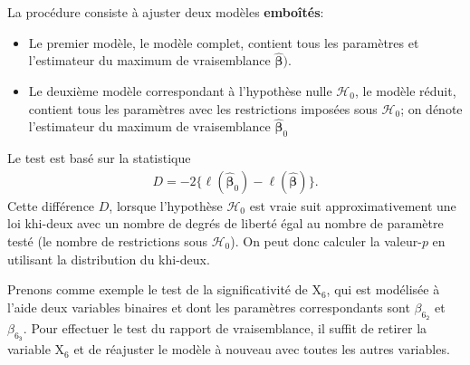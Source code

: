 \documentclass[
  11pt,
  letterpaper,
]{scrbook}
\newenvironment{Shaded}{\begin{snugshade}}{\end{snugshade}}
\newcommand{\AttributeTok}[1]{\textcolor[rgb]{0.40,0.45,0.13}{#1}}
\newcommand{\CommentTok}[1]{\textcolor[rgb]{0.37,0.37,0.37}{#1}}
\newcommand{\ConstantTok}[1]{\textcolor[rgb]{0.56,0.35,0.01}{#1}}
\newcommand{\DecValTok}[1]{\textcolor[rgb]{0.68,0.00,0.00}{#1}}
\newcommand{\DocumentationTok}[1]{\textcolor[rgb]{0.37,0.37,0.37}{\textit{#1}}}
\newcommand{\FunctionTok}[1]{\textcolor[rgb]{0.28,0.35,0.67}{#1}}
\newcommand{\NormalTok}[1]{\textcolor[rgb]{0.00,0.23,0.31}{#1}}
\newcommand{\OtherTok}[1]{\textcolor[rgb]{0.00,0.23,0.31}{#1}}
\newcommand{\SpecialCharTok}[1]{\textcolor[rgb]{0.37,0.37,0.37}{#1}}
\newcommand{\StringTok}[1]{\textcolor[rgb]{0.13,0.47,0.30}{#1}}
\providecommand{\tightlist}{%
  \setlength{\itemsep}{0pt}\setlength{\parskip}{0pt}}\usepackage{longtable,booktabs,array}
\theoremstyle{definition}
\theoremstyle{remark}
\begin{document}
La procédure consiste à ajuster deux modèles \textbf{emboîtés}:

\begin{itemize}
\tightlist
\item
  Le premier modèle, le modèle complet, contient tous les paramètres et
  l'estimateur du maximum de vraisemblance
  \(\widehat{\boldsymbol{\beta}})\).
\item
  Le deuxième modèle correspondant à l'hypothèse nulle
  \(\mathscr{H}_0\), le modèle réduit, contient tous les paramètres avec
  les restrictions imposées sous \(\mathscr{H}_0\); on dénote
  l'estimateur du maximum de vraisemblance
  \(\widehat{\boldsymbol{\beta}}_0\)
\end{itemize}

Le test est basé sur la statistique \begin{align*}
 D = -2\{\ell(\widehat{\boldsymbol{\beta}}_0)-\ell(\widehat{\boldsymbol{\beta}})\}.
\end{align*} Cette différence \(D\), lorsque l'hypothèse
\(\mathscr{H}_0\) est vraie suit approximativement une loi khi-deux avec
un nombre de degrés de liberté égal au nombre de paramètre testé (le
nombre de restrictions sous \(\mathscr{H}_0\)). On peut donc calculer la
valeur-\(p\) en utilisant la distribution du khi-deux.

Prenons comme exemple le test de la significativité de \(\mathrm{X}_6\),
qui est modélisée à l'aide deux variables binaires et dont les
paramètres correspondants sont \(\beta_{6_{\texttt{2}}}\) et
\(\beta_{6_{\texttt{3}}}\). Pour effectuer le test du rapport de
vraisemblance, il suffit de retirer la variable \(\mathrm{X}_6\) et de
réajuster le modèle à nouveau avec toutes les autres variables.

\begin{Shaded}
\end{Shaded}
\end{document}
